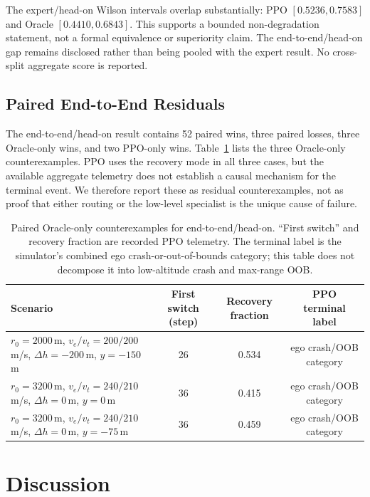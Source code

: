 \documentclass[5p,times]{elsarticle} %
\begin{document}
The expert/head-on Wilson intervals overlap substantially: PPO $[0.5236,0.7583]$ and Oracle $[0.4410,0.6843]$. This supports a bounded non-degradation statement, not a formal equivalence or superiority claim. The end-to-end/head-on gap remains disclosed rather than being pooled with the expert result. No cross-split aggregate score is reported.

\subsection{Paired End-to-End Residuals}

The end-to-end/head-on result contains 52 paired wins, three paired losses, three Oracle-only wins, and two PPO-only wins. Table~\ref{tab:residuals} lists the three Oracle-only counterexamples. PPO uses the recovery mode in all three cases, but the available aggregate telemetry does not establish a causal mechanism for the terminal event. We therefore report these as residual counterexamples, not as proof that either routing or the low-level specialist is the unique cause of failure.

\begin{table}[htbp]
\centering
\caption{Paired Oracle-only counterexamples for end-to-end/head-on. ``First switch'' and recovery fraction are recorded PPO telemetry. The terminal label is the simulator's combined ego crash-or-out-of-bounds category; this table does not decompose it into low-altitude crash and max-range OOB.}
\label{tab:residuals}
\begin{tabular}{@{}>{\raggedright\arraybackslash}p{7.0cm}ccc@{}}
\toprule
Scenario & First switch (step) & Recovery fraction & PPO terminal label \\
\midrule
$r_0=2000$\,m, $v_e/v_t=200/200$\,m/s, $\Delta h=-200$\,m, $y=-150$\,m & 26 & 0.534 & ego crash/OOB category \\
$r_0=3200$\,m, $v_e/v_t=240/210$\,m/s, $\Delta h=0$\,m, $y=0$\,m & 36 & 0.415 & ego crash/OOB category \\
$r_0=3200$\,m, $v_e/v_t=240/210$\,m/s, $\Delta h=0$\,m, $y=-75$\,m & 36 & 0.459 & ego crash/OOB category \\
\bottomrule
\end{tabular}
\end{table}

\section{Discussion}
\end{document}
